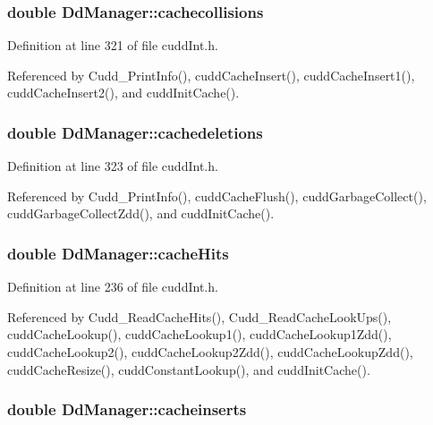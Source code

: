 \subsubsection{\setlength{\rightskip}{0pt plus 5cm}double \bf{Dd\-Manager::cachecollisions}}\label{structDdManager_d17390e65cbe632d5a6f2ddb7bf3a3aa}




Definition at line 321 of file cudd\-Int.h.

Referenced by Cudd\_\-Print\-Info(), cudd\-Cache\-Insert(), cudd\-Cache\-Insert1(), cudd\-Cache\-Insert2(), and cudd\-Init\-Cache().
\subsubsection{\setlength{\rightskip}{0pt plus 5cm}double \bf{Dd\-Manager::cachedeletions}}\label{structDdManager_ea5f5bcaa85ad9a053ac93f4d7a1d196}




Definition at line 323 of file cudd\-Int.h.

Referenced by Cudd\_\-Print\-Info(), cudd\-Cache\-Flush(), cudd\-Garbage\-Collect(), cudd\-Garbage\-Collect\-Zdd(), and cudd\-Init\-Cache().
\subsubsection{\setlength{\rightskip}{0pt plus 5cm}double \bf{Dd\-Manager::cache\-Hits}}\label{structDdManager_d87b20f8c9fb0511ed7c4e1d878805f5}




Definition at line 236 of file cudd\-Int.h.

Referenced by Cudd\_\-Read\-Cache\-Hits(), Cudd\_\-Read\-Cache\-Look\-Ups(), cudd\-Cache\-Lookup(), cudd\-Cache\-Lookup1(), cudd\-Cache\-Lookup1Zdd(), cudd\-Cache\-Lookup2(), cudd\-Cache\-Lookup2Zdd(), cudd\-Cache\-Lookup\-Zdd(), cudd\-Cache\-Resize(), cudd\-Constant\-Lookup(), and cudd\-Init\-Cache().
\subsubsection{\setlength{\rightskip}{0pt plus 5cm}double \bf{Dd\-Manager::cacheinserts}}\label{structDdManager_af4bbfa6d0c1eee6bf69428eadfcea8b}




